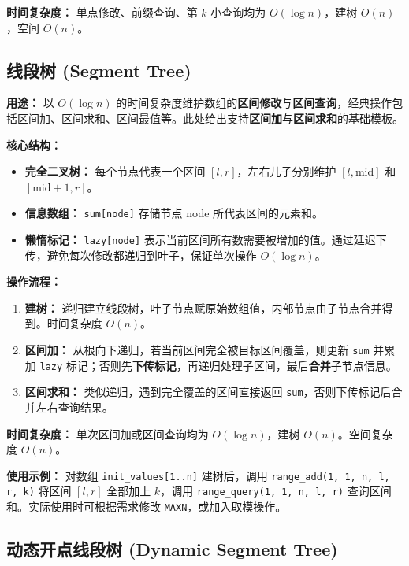 \textbf{时间复杂度：} 单点修改、前缀查询、第 $k$ 小查询均为 $O(\log n)$，建树 $O(n)$，空间 $O(n)$。



\subsection{线段树 (Segment Tree)}

\textbf{用途：}
以 $O(\log n)$ 的时间复杂度维护数组的\textbf{区间修改}与\textbf{区间查询}，经典操作包括区间加、区间求和、区间最值等。此处给出支持\textbf{区间加}与\textbf{区间求和}的基础模板。

\textbf{核心结构：}
\begin{itemize}
  \item \textbf{完全二叉树：} 每个节点代表一个区间 $[l,r]$，左右儿子分别维护 $[l,\text{mid}]$ 和 $[\text{mid}+1,r]$。
  \item \textbf{信息数组：} \texttt{sum[node]} 存储节点 node 所代表区间的元素和。
  \item \textbf{懒惰标记：} \texttt{lazy[node]} 表示当前区间所有数需要被增加的值。通过延迟下传，避免每次修改都递归到叶子，保证单次操作 $O(\log n)$。
\end{itemize}

\textbf{操作流程：}
\begin{enumerate}
  \item \textbf{建树：} 递归建立线段树，叶子节点赋原始数组值，内部节点由子节点合并得到。时间复杂度 $O(n)$。
  \item \textbf{区间加：} 从根向下递归，若当前区间完全被目标区间覆盖，则更新 \texttt{sum} 并累加 \texttt{lazy} 标记；否则先\textbf{下传标记}，再递归处理子区间，最后\textbf{合并}子节点信息。
  \item \textbf{区间求和：} 类似递归，遇到完全覆盖的区间直接返回 \texttt{sum}，否则下传标记后合并左右查询结果。
\end{enumerate}

\textbf{时间复杂度：}
单次区间加或区间查询均为 $O(\log n)$，建树 $O(n)$。空间复杂度 $O(n)$。



\textbf{使用示例：}
对数组 \texttt{init\_values[1..n]} 建树后，调用 \texttt{range\_add(1, 1, n, l, r, k)} 将区间 $[l,r]$ 全部加上 $k$，调用 \texttt{range\_query(1, 1, n, l, r)} 查询区间和。实际使用时可根据需求修改 \texttt{MAXN}，或加入取模操作。

\subsection{动态开点线段树 (Dynamic Segment Tree)}

